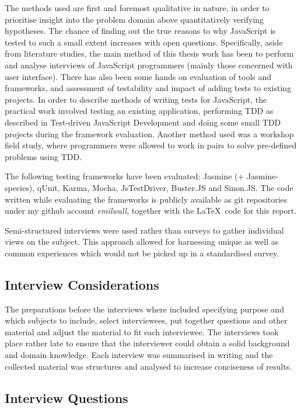 \documentclass[11pt]{article}
\begin{document}
The methods used are first and foremost qualitative in nature, in order to prioritise insight into the problem domain above quantitatively verifying hypotheses. The chance of finding out the true reasons to why JavaScript is tested to such a small extent increases with open questions. Specifically, aside from literature studies, the main method of this thesis work has been to perform and analyse interviews of JavaScript programmers (mainly those concerned with user interface). There has also been some hands on evaluation of tools and frameworks, and assessment of testability and impact of adding tests to existing projects. In order to describe methods of writing tests for JavaScript, the practical work involved testing an existing application, performing TDD as described in Test-driven JavaScript Development\cite{Tddjs} and doing some small TDD projects during the framework evaluation. Another method used was a workshop field study, where programmers were allowed to work in pairs to solve pre-defined problems using TDD.

The following testing frameworks have been evaluated: Jasmine\cite{JasmineSite} (+ Jasmine-species\cite{JasmineSpecies}), qUnit\cite{QUnitSite}, Karma\cite{KarmaSite}, Mocha\cite{MochaSite}, JsTestDriver\cite{JsTestDriver}, Buster.JS\cite{BusterJS} and Sinon.JS\cite{SinonJS}. The code written while evaluating the frameworks is publicly available as git repositories under my github account \emph{emilwall}, together with the \LaTeX~code for this report.

Semi-structured interviews were used rather than surveys to gather individual views on the subject. This approach allowed for harnessing unique as well as common experiences which would not be picked up in a standardised survey.

\subsection{Interview Considerations}

The preparations before the interviews where included specifying purpose and which subjects to include, select interviewees, put together questions and other material and adjust the material to fit each interviewee. The interviews took place rather late to ensure that the interviewer could obtain a solid background and domain knowledge. Each interview was summarised in writing and the collected material was structures and analysed to increase conciseness of results.

\subsection{Interview Questions}
\end{document}
